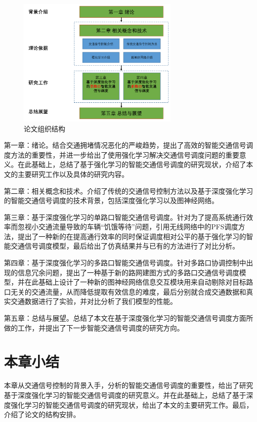 \begin{figure}[htb]
    \includegraphics[width=0.7\textwidth]{fig/paper-struct.pdf}
    \caption{论文组织结构}
    \label{fig:paper-struct}
\end{figure}
第一章：绪论。结合交通拥堵情况恶化的严峻趋势，提出了高效的智能交通信号调度方法的重要性，并进一步给出了使用强化学习解决交通信号调度问题的重要意义。在此基础上，总结了基于强化学习的智能交通信号调度的研究现状，介绍了本文的主要研究工作以及具体的研究内容。

第二章：相关概念和技术。介绍了传统的交通信号控制方法以及基于深度强化学习的智能交通信号调度的技术背景，包括深度强化学习以及图神经网络。

第三章：基于深度强化学习的单路口智能交通信号调度。针对为了提高系统通行效率而忽视小交通流量导致的车辆“饥饿等待”问题，引用无线网络中的PFS调度方法，提出了一种新的在提高通行效率的同时保证调度相对公平的基于强化学习的智能交通信号调度模型，最后给出了仿真结果并与已有的方法进行了对比分析。

第四章：基于深度强化学习的多路口智能交通信号调度。针对多路口协调控制中出现的信息冗余问题，提出了一种基于新的路网建图方式的多路口交通信号调度模型，并在此基础上设计了一种新的图神经网络信息交互模块用来自动剔除对目标路口无关的交通流量，从而降低提取有效信息的难度，最后分别就合成交通数据和真实交通数据进行了实验，并对比分析了我们模型的性能。

第五章：总结与展望。总结了本文在基于深度强化学习的智能交通信号调度方面所做的工作，并提出了下一步智能交通信号调度的研究方向。

\section{本章小结}
本章从交通信号控制的背景入手，分析的智能交通信号调度的重要性，给出了研究基于深度强化学习的智能交通信号调度的研究意义。并在此基础上，总结了基于深度强化学习的智能交通信号调度的研究现状，给出了本文的主要研究工作。最后，介绍了论文的结构安排。